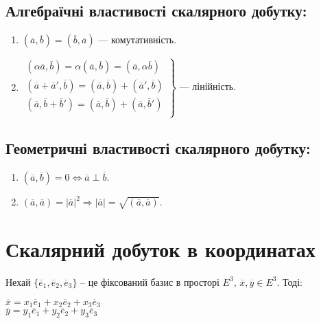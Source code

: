 \subsection*{Алгебраїчні властивості скалярного добутку:}
\begin{enumerate}
	\item $(\overline{a}, \overline{b}) = (\overline{b}, \overline{a})$ --- комутативність.
	\item $\left.\begin{array}{l}
				(\alpha\overline{a}, \overline{b}) = \alpha(\overline{a}, \overline{b}) = (\overline{a}, \alpha\overline{b})  \\
				(\overline{a} + \overline{a}', \overline{b}) = (\overline{a}, \overline{b}) + (\overline{a}', \overline{b})  \\
				(\overline{a}, \overline{b} + \overline{b}') = (\overline{a}, \overline{b}) + (\overline{a}, \overline{b}')  \\
		  \end{array}\right\}$ --- лінійність.
\end{enumerate}

\subsection*{Геометричні властивості скалярного добутку:}
\begin{enumerate}
	\item $(\overline{a}, \overline{b}) = 0 \Leftrightarrow \overline{a} \perp \overline{b}$.
	\item $(\overline{a}, \overline{a}) = |\overline{a}|^2 \Rightarrow |\overline{a}| = \sqrt{(\overline{a}, \overline{a})}$.
\end{enumerate}

\section{Скалярний добуток в координатах}

Нехай $\{\overline{e}_1, \overline{e}_2, \overline{e}_3\}$ – це фіксований базис в просторі $E^3$,
$\overline{x}, \overline{y} \in E^3$. Тоді:
\begin{center}
	$\overline{x} = x_1\overline{e}_1 + x_2\overline{e}_2 + x_3\overline{e}_3$  \\
	$\overline{y} = y_1\overline{e}_1 + y_2\overline{e}_2 + y_3\overline{e}_3$  \\
\end{center}

